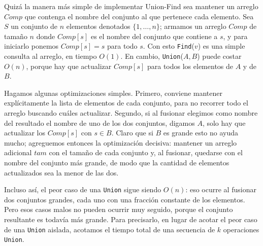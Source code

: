 \documentclass[12pt, spanish, oneside, openany]{book}
\theoremstyle{uprightplain}
\theoremstyle{definition}
\theoremstyle{remark}
\theoremstyle{definition}
\begin{document}
Quizá la manera más simple de implementar Union-Find sea mantener un arreglo $\mathit{Comp}$ que contenga el nombre del conjunto al que pertenece cada elemento. Sea $S$ un conjunto de $n$ elementos denotados $\{1,\dots,n\}$; armamos un arreglo $\mathit{Comp}$ de tamaño $n$ donde $\mathit{Comp}[s]$ es el nombre del conjunto que contiene a $s$, y para iniciarlo ponemos $\mathit{Comp}[s]=s$ para todo $s$. Con esto \texttt{Find}($v$) es una simple consulta al arreglo, en tiempo $O(1)$. En cambio, \texttt{Union}($A,B$) puede costar $O(n)$, porque hay que actualizar $\mathit{Comp}[s]$ para todos los elementos de $A$ y de $B$.

Hagamos algunas optimizaciones simples. Primero, conviene mantener explícitamente la lista de elementos de cada conjunto, para no recorrer todo el arreglo buscando cuáles actualizar. Segundo, si al fusionar elegimos como nombre del resultado el nombre de uno de los dos conjuntos, digamos $A$, solo hay que actualizar los $\mathit{Comp}[s]$ con $s \in B$. Claro que si $B$ es grande esto no ayuda mucho; agreguemos entonces la optimización decisiva: mantener un arreglo adicional $\mathit{tam}$ con el tamaño de cada conjunto y, al fusionar, quedarse con el nombre del conjunto más grande, de modo que la cantidad de elementos actualizados sea la menor de las dos.

Incluso así, el peor caso de una \texttt{Union} sigue siendo $O(n)$: eso ocurre al fusionar dos conjuntos grandes, cada uno con una fracción constante de los elementos. Pero esos casos malos no pueden ocurrir muy seguido, porque el conjunto resultante es todavía más grande. Para precisarlo, en lugar de acotar el peor caso de una \texttt{Union} aislada, acotamos el tiempo total de una secuencia de $k$ operaciones \texttt{Union}.
\end{document}
